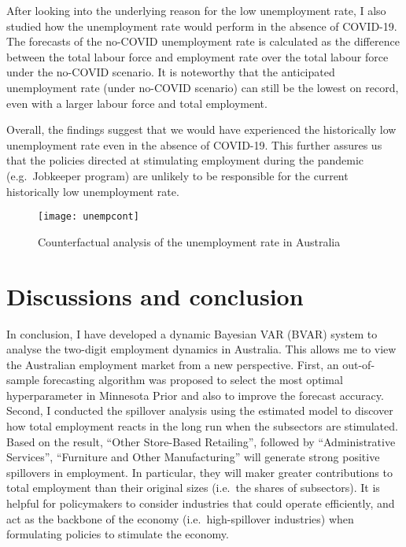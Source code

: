 \documentclass{monashthesis}
\begin{document}
After looking into the underlying reason for the low unemployment rate, I also studied how the unemployment rate would perform in the absence of COVID-19. The forecasts of the no-COVID unemployment rate is calculated as the difference between the total labour force and employment rate over the total labour force under the no-COVID scenario. It is noteworthy that the anticipated unemployment rate (under no-COVID scenario) can still be the lowest on record, even with a larger labour force and total employment.

Overall, the findings suggest that we would have experienced the historically low unemployment rate even in the absence of COVID-19. This further assures us that the policies directed at stimulating employment during the pandemic (e.g.~Jobkeeper program) are unlikely to be responsible for the current historically low unemployment rate.

\begin{figure}[H]
\texttt{[image: unempcont]}
\centering
\caption{Counterfactual analysis of the unemployment rate in Australia}
\label{fig:unrate}
\end{figure}

\clearpage

\hypertarget{discussions-and-conclusion}{%
\chapter{Discussions and conclusion}\label{discussions-and-conclusion}}

In conclusion, I have developed a dynamic Bayesian VAR (BVAR) system to analyse the two-digit employment dynamics in Australia. This allows me to view the Australian employment market from a new perspective. First, an out-of-sample forecasting algorithm was proposed to select the most optimal hyperparameter in Minnesota Prior and also to improve the forecast accuracy. Second, I conducted the spillover analysis using the estimated model to discover how total employment reacts in the long run when the subsectors are stimulated. Based on the result, ``Other Store-Based Retailing'', followed by ``Administrative Services'', ``Furniture and Other Manufacturing'' will generate strong positive spillovers in employment. In particular, they will maker greater contributions to total employment than their original sizes (i.e.~the shares of subsectors). It is helpful for policymakers to consider industries that could operate efficiently, and act as the backbone of the economy (i.e.~high-spillover industries) when formulating policies to stimulate the economy.
\end{document}
